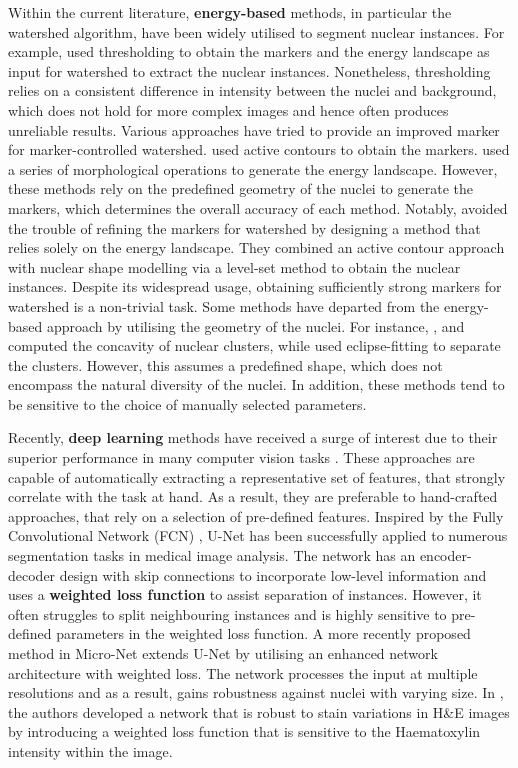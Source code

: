 \documentclass[journal]{IEEEtran}
\begin{document}
	Within the current literature, \textbf{energy-based} methods, in particular the watershed algorithm, have been widely utilised to segment nuclear instances. For example, \cite{yang2006nuclei} used thresholding to obtain the markers and the energy landscape as input for watershed to extract the nuclear instances. Nonetheless, thresholding relies on a consistent difference in intensity between the nuclei and background, which does not hold for more complex images and hence often produces unreliable results. Various approaches have tried to provide an improved marker for marker-controlled watershed. \cite{cheng2009segmentation} used active contours to obtain the markers. \cite{veta2013} used a series of morphological operations to generate the energy landscape. However, these methods rely on the predefined geometry of the nuclei to generate the markers, which determines the overall accuracy of each method. Notably, \cite{ali2012integrated} avoided the trouble of refining the markers for watershed by designing a method that relies solely on the energy landscape. They combined an active contour approach with nuclear shape modelling via a level-set method to obtain the nuclear instances. Despite its widespread usage, obtaining sufficiently strong markers for watershed is a non-trivial task. Some methods have departed from the energy-based approach by utilising the geometry of the nuclei. For instance, \cite{wienert2012detection}, \cite{latorre2013concave} and \cite{kwak2015nucleus} computed the concavity of nuclear clusters, while \cite{liao2016eclipse} used eclipse-fitting to separate the clusters. However, this assumes a predefined shape, which does not encompass the natural diversity of the nuclei. In addition, these methods tend to be sensitive to the choice of manually selected parameters.
	
	Recently, \textbf{deep learning} methods have received a surge of interest due to their superior performance in many computer vision tasks \cite{litjens2017survey,shen2017deep,lecun2015deep}. These approaches are capable of automatically extracting a representative set of features, that strongly correlate with the task at hand. As a result, they are preferable to hand-crafted approaches, that rely on a selection of pre-defined features. Inspired by the Fully Convolutional Network (FCN) \cite{long2015fully}, U-Net \cite{ronneberger2015u} has been successfully applied to numerous segmentation tasks in medical image analysis. The network has an encoder-decoder design with skip connections to incorporate low-level information and uses a \textbf{weighted loss function} to assist separation of instances. However, it often struggles to split neighbouring instances and is highly sensitive to pre-defined parameters in the weighted loss function. A more recently proposed method in Micro-Net \cite{micronet2018Shan} extends U-Net by utilising an enhanced network architecture with weighted loss. The network processes the input at multiple resolutions and as a result, gains robustness against nuclei with varying size. In \cite{graham2018b}, the authors developed a network that is robust to stain variations in H\&E images by introducing a weighted loss function that is sensitive to the Haematoxylin intensity within the image. 
	
\end{document}

